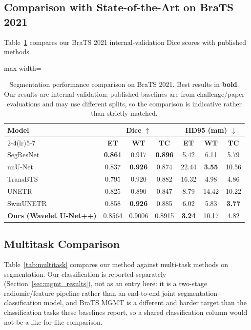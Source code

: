 \documentclass[conference]{IEEEtran}
\begin{document}
\subsection{Comparison with State-of-the-Art on BraTS 2021}

Table~\ref{tab:seg_comparison} compares our BraTS 2021 internal-validation Dice scores with published methods.

\begin{table}[!t]
\centering
\caption{Segmentation performance comparison on BraTS 2021. Best results in \textbf{bold}. Our results are internal-validation; published baselines are from challenge/paper evaluations and may use different splits, so the comparison is indicative rather than strictly matched.}
\label{tab:seg_comparison}
\begin{adjustbox}{max width=\columnwidth}
\begin{tabular}{lcccccc}
\toprule
\multirow{2}{*}{\textbf{Model}} &
\multicolumn{3}{c}{\textbf{Dice} $\uparrow$} &
\multicolumn{3}{c}{\textbf{HD95 (mm)} $\downarrow$} \\
\cmidrule(lr){2-4}\cmidrule(lr){5-7}
& \textbf{ET} & \textbf{WT} & \textbf{TC} & \textbf{ET} & \textbf{WT} & \textbf{TC} \\
\midrule
SegResNet~\cite{myronenko2019segresnet} & \textbf{0.861} & 0.917 & \textbf{0.896} & 5.42 & 6.11 & 5.79 \\
nnU-Net~\cite{isensee2021nnu} & 0.837 & \textbf{0.926} & 0.874 & 22.44 & \textbf{3.55} & 10.56 \\
TransBTS~\cite{wang2021transbts} & 0.795 & 0.920 & 0.882 & 16.32 & 4.98 & 4.86 \\
UNETR~\cite{hatamizadeh2022unetr} & 0.825 & 0.890 & 0.847 & 8.79 & 14.42 & 10.22 \\
SwinUNETR~\cite{hatamizadeh2022swinunetr} & 0.858 & \textbf{0.926} & 0.885 & 6.02 & 5.83 & \textbf{3.77} \\
\midrule
\textbf{Ours (Wavelet U-Net++)} & 0.8564 & 0.9006 & 0.8915 & \textbf{3.24} & 10.17 & 4.82 \\
\bottomrule
\end{tabular}
\end{adjustbox}
\end{table}

\subsection{Multitask Comparison}

Table~\ref{tab:multitask} compares our method against multi-task methods on segmentation. Our classification is reported separately (Section~\ref{sec:mgmt_results}), not as an entry here: it is a two-stage radiomic/feature pipeline rather than an end-to-end joint segmentation--classification model, and BraTS MGMT is a different and harder target than the classification tasks these baselines report, so a shared classification column would not be a like-for-like comparison.
\end{document}
